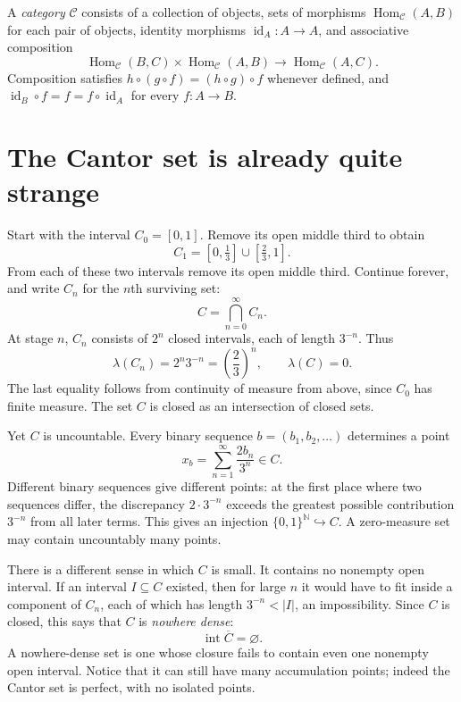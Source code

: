\begin{definition}
A \emph{category} \(\mathcal C\) consists of a collection of objects, sets of morphisms \(\operatorname{Hom}_{\mathcal C}(A,B)\) for each pair of objects, identity morphisms \(\operatorname{id}_A:A\to A\), and associative composition
\[
 \operatorname{Hom}_{\mathcal C}(B,C)\times
 \operatorname{Hom}_{\mathcal C}(A,B)
 \longrightarrow \operatorname{Hom}_{\mathcal C}(A,C).
\]
Composition satisfies \(h\circ(g\circ f)=(h\circ g)\circ f\) whenever defined, and \(\operatorname{id}_B\circ f=f=f\circ\operatorname{id}_A\) for every \(f:A\to B\).
\end{definition}

\section{The Cantor set is already quite strange}

Start with the interval \(C_0=[0,1]\). Remove its open middle third to obtain
\[
 C_1=[0,\tfrac13]\cup[\tfrac23,1].
\]
From each of these two intervals remove its open middle third. Continue forever, and write \(C_n\) for the \(n\)th surviving set:
\[
 C=\bigcap_{n=0}^\infty C_n.
\]
At stage \(n\), \(C_n\) consists of \(2^n\) closed intervals, each of length \(3^{-n}\). Thus
\[
 \lambda(C_n)=2^n3^{-n}=\left(\frac23\right)^n,
 \qquad
 \boxed{\lambda(C)=0}.
\]
The last equality follows from continuity of measure from above, since \(C_0\) has finite measure. The set \(C\) is closed as an intersection of closed sets.

Yet \(C\) is uncountable. Every binary sequence \(b=(b_1,b_2,\ldots)\) determines a point
\[
 x_b=\sum_{n=1}^\infty\frac{2b_n}{3^n}\in C.
\]
Different binary sequences give different points: at the first place where two sequences differ, the discrepancy \(2\cdot3^{-n}\) exceeds the greatest possible contribution \(3^{-n}\) from all later terms. This gives an injection \(\{0,1\}^{\mathbb N}\hookrightarrow C\). A zero-measure set may contain uncountably many points.

There is a different sense in which \(C\) is small. It contains no nonempty open interval. If an interval \(I\subseteq C\) existed, then for large \(n\) it would have to fit inside a component of \(C_n\), each of which has length \(3^{-n}<|I|\), an impossibility. Since \(C\) is closed, this says that \(C\) is \emph{nowhere dense}:
\[
 \operatorname{int}\overline C=\varnothing.
\]
A nowhere-dense set is one whose closure fails to contain even one nonempty open interval. Notice that it can still have many accumulation points; indeed the Cantor set is perfect, with no isolated points.

